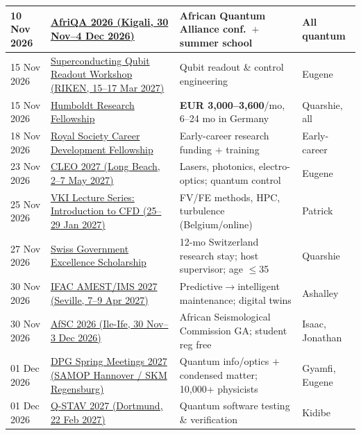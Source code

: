 \begin{longtable}{@{}p{2.0cm}p{4.4cm}p{5.2cm}p{3.0cm}@{}}
\midrule
10 Nov 2026 & \href{https://afriqa.aimsric.org/}{AfriQA 2026 (Kigali, 30 Nov--4 Dec 2026)} & African Quantum Alliance conf.\ $+$ summer school & All quantum  \\
\midrule
15 Nov 2026 & \href{https://rqc.riken.jp/sqrw2027/}{Superconducting Qubit Readout Workshop (RIKEN, 15--17 Mar 2027)} & Qubit readout \& control engineering & Eugene  \\
\midrule
15 Nov 2026 & \href{https://www.humboldt-foundation.de/en/apply/sponsorship-programmes/humboldt-research-fellowship}{Humboldt Research Fellowship} & \textbf{EUR 3{,}000--3{,}600}/mo, 6--24 mo in Germany & Quarshie, all  \\
\midrule
18 Nov 2026 & \href{https://royalsociety.org/grants/career-development-fellowship/}{Royal Society Career Development Fellowship} & Early-career research funding $+$ training & Early-career  \\
\midrule
23 Nov 2026 & \href{https://cleoconference.org/}{CLEO 2027 (Long Beach, 2--7 May 2027)} & Lasers, photonics, electro-optics; quantum control & Eugene  \\
\midrule
25 Nov 2026 & \href{https://ls.vki.ac.be/store/lsdetails/229/introduction-to-computational-fluid-dynamics-2027}{VKI Lecture Series: Introduction to CFD (25--29 Jan 2027)} & FV/FE methods, HPC, turbulence (Belgium/online) & Patrick  \\
\midrule
27 Nov 2026 & \href{https://www.sbfi.admin.ch/en/swiss-government-excellence-scholarships}{Swiss Government Excellence Scholarship} & 12-mo Switzerland research stay; host supervisor; age $\leq$35 & Quarshie  \\
\midrule
30 Nov 2026 & \href{https://www.linkedin.com/posts/digest-pn-6727052b0_callforpapers-ifac-amest2027-ims-2027-activity-7502622229021499393-pJOU}{IFAC AMEST/IMS 2027 (Seville, 7--9 Apr 2027)} & Predictive$\rightarrow$intelligent maintenance; digital twins & Ashalley  \\
\midrule
30 Nov 2026 & \href{https://afsc2026.oauife.edu.ng/}{AfSC 2026 (Ile-Ife, 30 Nov--3 Dec 2026)} & African Seismological Commission GA; student reg free & Isaac, Jonathan  \\
\midrule
01 Dec 2026 & \href{https://www.dpg-physik.de/aktivitaeten-und-programme/tagungen/fruehjahrstagungen/2027}{DPG Spring Meetings 2027 (SAMOP Hannover / SKM Regensburg)} & Quantum info/optics $+$ condensed matter; 10{,}000+ physicists & Gyamfi, Eugene  \\
\midrule
01 Dec 2026 & \href{https://www.spp2514.kit.edu/Q-STAV_2027.php}{Q-STAV 2027 (Dortmund, 22 Feb 2027)} & Quantum software testing \& verification & Kidibe  \\

\end{longtable}
